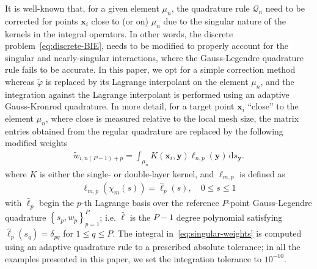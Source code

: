 \documentclass[review,hidelinks,onefignum,onetabnum]{siamart220329}
\newcommand{\bx}{\mathbf{x}}
\newcommand{\by}{\mathbf{y}}
\newcommand{\de}{\,\mathrm{d}}
\newcommand{\tvarphi}{\widetilde \varphi}
\begin{document}
It is well-known that, for a given element $\mu_n$, the quadrature rule $\mathcal{Q}_n$ need to be corrected for points $\bx_i$ close to (or on) $\mu_n$ due to the singular nature of the kernels in the integral operators. In other words, the discrete problem~\cref{eq:discrete-BIE}, needs to be modified to properly account for the singular and nearly-singular interactions, where the Gauss-Legendre quadrature rule fails to be accurate. In this paper, we opt for a simple correction method whereas $\tvarphi$ is replaced by its Lagrange interpolant on the element $\mu_n$, and the integration against the Lagrange interpolant is performed using an adaptive Gauss-Kronrod quadrature. In more detail, for a target point $\bx_i$ ``close'' to the element $\mu_n$, where close is measured relative to the local mesh size, the matrix entries obtained from the regular quadrature are replaced by the following modified weights
\begin{align}
    \label{eq:singular-weights}
    \widetilde{w}_{i,n(P-1)+p} = \int_{\mu_n} K(\bx_i,\by)   \ell_{n,p}(\by) \de s_{\by}.
\end{align}
where $K$ is either the single- or double-layer kernel, and $\ell_{m,p}$ is defined as 
\begin{align}
    \ell_{m,p}(\chi_m(s)) = \hat{\ell}_p(s), \quad  0 \leq s \leq 1
\end{align}
with $\hat{\ell}_p$ begin the $p$-th Lagrange basis over the reference $P$-point Gauss-Legendre quadrature $\left\{ s_p, w_p \right\}_{p=1}^P$; i.e. $\hat{\ell}$ is the $P-1$ degree polynomial satisfying $\hat{\ell}_p(s_q) = \delta_{pq}$ for $1 \leq q \leq P$. The integral in~\cref{eq:singular-weights} is computed using an adaptive quadrature rule to a prescribed absolute tolerance; in all the examples presented in this paper, we set the integration tolerance to $10^{-10}$. 
\end{document}
